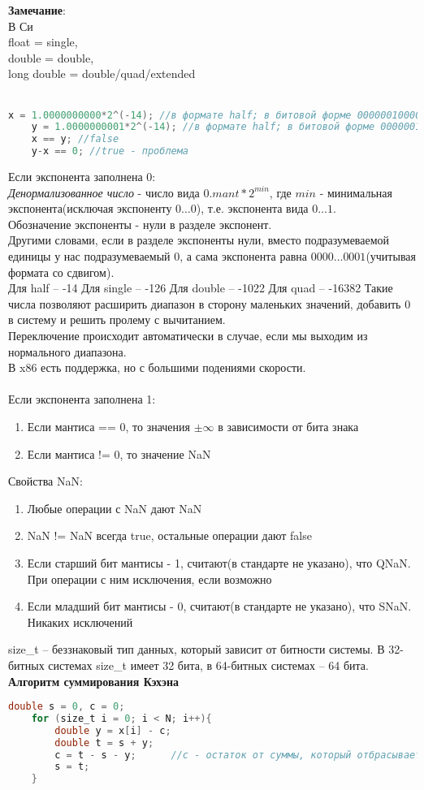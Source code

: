 \documentclass[12pt]{article}
\begin{document}
\textbf{Замечание}:\\
В Си \\float = single, \\double = double, \\long double = double/quad/extended\\\\
\begin{lstlisting}[language = C]
    x = 1.0000000000*2^(-14); //в формате half; в битовой форме 00000010000000000
    y = 1.0000000001*2^(-14); //в формате half; в битовой форме 00000010000000001
    x == y; //false
    y-x == 0; //true - проблема
\end{lstlisting}
Если экспонента заполнена 0:\\
\textit{Денормализованное число} - число вида $0.mant*2^{min}$, где $min$ - минимальная экспонента(исключая экспоненту $0\ldots0$), т.е. экспонента вида $0\ldots1$.\\
Обозначение экспоненты - нули в разделе экспонент.\\
Другими словами, если в разделе экспоненты нули, вместо подразумеваемой единицы у нас подразумеваемый 0, а сама экспонента равна $0000\ldots 0001$(учитывая формата со сдвигом).\\
Для half -- -14
Для single -- -126
Для double -- -1022
Для quad -- -16382
Такие числа позволяют расширить диапазон в сторону маленьких значений, добавить 0 в систему и решить пролему с вычитанием.\\
Переключение происходит автоматически в случае, если мы выходим из нормального диапазона.\\
В x86 есть поддержка, но с большими подениями скорости.\\\\
Если экспонента заполнена 1:
\begin{enumerate}
    \item Если мантиса == 0, то значения $\pm\infty$ в зависимости от бита знака
    \item Если мантиса != 0, то значение NaN
\end{enumerate}
Свойства NaN:
\begin{enumerate}
    \item Любые операции с NaN дают NaN
    \item NaN != NaN всегда true, остальные операции дают false
    \item Если старший бит мантисы - 1, считают(в стандарте не указано), что QNaN. При операции с ним исключения, если возможно
    \item Если младший бит мантисы - 0, считают(в стандарте не указано), что SNaN. Никаких исключений
\end{enumerate}
size\_t -- беззнаковый тип данных, который зависит от битности системы. В 32-битных системах size\_t имеет 32 бита, в 64-битных системах -- 64 бита.\\
\textbf{Алгоритм суммирования Кэхэна}
\begin{lstlisting}[language=C]
    double s = 0, c = 0;
    for (size_t i = 0; i < N; i++){
        double y = x[i] - c;
        double t = s + y;
        c = t - s - y;      //c - остаток от суммы, который отбрасывается при суммировании
        s = t;
    }
\end{lstlisting}
\end{document}
